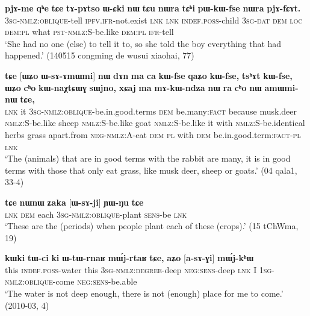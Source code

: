 \documentclass[oneside,a4paper,11pt]{article}
\newcommand{\ipa}[1]{\textbf{{\phon\mbox{#1}}}} %
\begin{document}
 \begin{exe}
\ex \label{ex:WsAfCAt}
\gll
[\ipa{ɯ-sɤ-fɕɤt}] \ipa{pjɤ-me} 	\ipa{qʰe} 	\ipa{tɕe} 	\ipa{tɤ-pɤtso} 	\ipa{ɯ-ɕki} 	\ipa{nɯ} 	\ipa{tɕu} 	\ipa{nɯra} 	\ipa{tɕʰi} 	\ipa{pɯ-kɯ-fse} 	\ipa{nɯra} 	\ipa{pjɤ-fɕɤt.} \\
\textsc{3sg-nmlz:oblique}-tell \textsc{ipfv.ifr}-not.exist \textsc{lnk} \textsc{lnk} \textsc{indef.poss}-child \textsc{3sg-dat} \textsc{dem} \textsc{loc} \textsc{dem:pl} what \textsc{pst-nmlz:S}-be.like  \textsc{dem:pl} \textsc{ifr}-tell \\
\glt `She had no one (else) to tell it to, so she told the boy everything that had happened.' (140515 congming de wusui xiaohai, 77)
\end{exe} 

\begin{exe}
   \ex \label{ex:WsAmWmi}
 \gll 
\ipa{tɕe}   	[\ipa{ɯʑo}   	\ipa{ɯ-sɤ-ɤmɯmi}]  	\ipa{nɯ}   	\ipa{dɤn}   	\ipa{ma}   	\ipa{ca}   	\ipa{kɯ-fse}   	\ipa{qaʑo}   	\ipa{kɯ-fse,}   	\ipa{tsʰɤt}   	\ipa{kɯ-fse,}   	 \ipa{ɯʑo}   	\ipa{cʰo}   	\ipa{kɯ-naχtɕɯɣ}   	\ipa{sɯjno,}   	\ipa{xɕaj}   	\ipa{ma}   	\ipa{mɤ-kɯ-ndza}   	\ipa{nɯ} \ipa{ra}   	\ipa{cʰo}   	\ipa{nɯ}   	\ipa{amɯmi-nɯ}   	\ipa{tɕe,}   \\
\textsc{lnk} it \textsc{3sg-nmlz:oblique}-be.in.good.terms \textsc{dem} be.many:\textsc{fact} because musk.deer \textsc{nmlz:S}-be.like sheep \textsc{nmlz:S}-be.like goat  \textsc{nmlz:S}-be.like it with  \textsc{nmlz:S}-be.identical herbs grass apart.from \textsc{neg-nmlz:A}-eat \textsc{dem} \textsc{pl} with \textsc{dem} be.in.good.term:\textsc{fact}-\textsc{pl} \textsc{lnk} \\
\glt `The (animals) that are in good terms with the rabbit are many, it is in good terms with those that only eat grass, like musk deer, sheep or goats.' (04 qala1, 33-4)
\end{exe}

\begin{exe}
   \ex \label{ex:WsAji}
   \gll
   \ipa{tɕe} 	\ipa{nɯnɯ} 	\ipa{ʑaka} 	[\ipa{ɯ-sɤ-ji}] 	\ipa{ɲɯ-ŋu} 	\ipa{tɕe}\\
   \textsc{lnk} \textsc{dem} each \textsc{3sg-nmlz:oblique}-plant \textsc{sens}-be \textsc{lnk}\\
\glt `These are the (periods) when people plant each of these (crops).' (15 tChWma, 19)
\end{exe}

\begin{exe}
   \ex \label{ex:asAGi} 
 \gll
\ipa{kɯki}   	\ipa{tɯ-ci}   	\ipa{ki}   	\ipa{ɯ-tɯ-rnaʁ}   	\ipa{mɯ́j-rtaʁ}   	\ipa{tɕe,}   	\ipa{aʑo}   	[\ipa{a-sɤ-ɣi}]   	\ipa{mɯ́j-kʰɯ}   \\
this \textsc{indef.poss}-water this \textsc{3sg-nmlz:degree}-deep \textsc{neg:sens}-deep \textsc{lnk} I \textsc{1sg-nmlz:oblique}-come \textsc{neg:sens}-be.able \\
\glt `The water is not deep enough, there is not (enough) place for me to come.' (2010-03, 4)
\end{exe}
\end{document}
